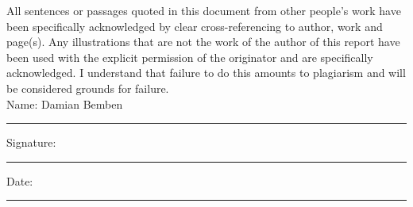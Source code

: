 \documentclass[11pt,oneside]{book}
\begin{document}
All sentences or passages quoted in this document from other people's work have been specifically acknowledged by clear cross-referencing to author, work and page(s).  Any illustrations that are not the work of the author of this report have been used with the explicit permission of the originator and are specifically acknowledged.  I understand that failure to do this amounts to plagiarism and will be considered grounds for failure.\\[1cm]

\noindent Name: Damian Bemben\\[1mm]
\rule[1em]{25em}{0.5pt}

\noindent Signature:\\[1mm]
\rule[1em]{25em}{0.5pt}

\noindent Date:\\[1mm]
\rule[1em]{25em}{0.5pt}





% 




\tableofcontents
\listoffigures
\listoftables



\mainmatter










 
 



\begin{appendices}


\end{appendices}
\end{document}
